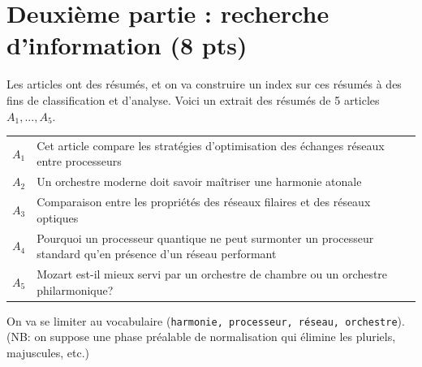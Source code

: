 \documentclass[11pt,a4paper]{article}
\begin{document}
\section*{Deuxième partie : recherche d'information (8 pts)}

Les articles ont des résumés, et on va construire un index sur ces résumés à des fins
de classification et d'analyse. Voici un extrait des résumés de 5 articles
$A_1, ..., A_5$.
\vspace*{0.3cm}

\begin{tabular}{lp{15cm}}
     $A_1$& Cet article compare les stratégies d'optimisation des échanges réseaux entre processeurs\\
     $A_2$& Un orchestre moderne doit savoir maîtriser une harmonie atonale\\
     $A_3$& Comparaison entre les propriétés des réseaux filaires et des réseaux optiques\\
     $A_4$& Pourquoi un processeur quantique ne peut surmonter un processeur standard
         qu'en présence d'un réseau performant\\
     $A_5$& Mozart est-il mieux servi par un orchestre de chambre ou un orchestre philarmonique?\\
\end{tabular}

\bigskip

On va se limiter au vocabulaire (\texttt{harmonie, processeur, réseau, orchestre}).
(NB: on suppose
     une phase préalable de normalisation qui élimine les pluriels, majuscules, etc.)
\end{document}
